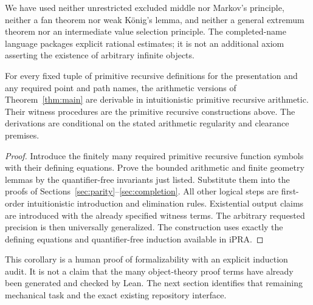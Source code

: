 We have used neither unrestricted excluded middle nor
Markov's principle, neither a fan theorem nor weak
K\"onig's lemma, and neither a general extremum theorem
nor an intermediate value selection principle.
The completed-name language packages explicit rational
estimates; it is not an additional axiom asserting the
existence of arbitrary infinite objects.

\begin{corollary}\label{cor:ipra}
For every fixed tuple of primitive recursive definitions
for the presentation and any required point and path names,
the arithmetic versions of Theorem~\ref{thm:main} are
derivable in intuitionistic primitive recursive arithmetic.
Their witness procedures are the primitive recursive
constructions above. The derivations are conditional on
the stated arithmetic regularity and clearance premises.
\end{corollary}

\begin{proof}
Introduce the finitely many required primitive recursive
function symbols with their defining equations. Prove the
bounded arithmetic and finite geometry lemmas by the
quantifier-free invariants just listed. Substitute them
into the proofs of Sections~\ref{sec:parity}--\ref{sec:completion}.
All other logical steps are first-order intuitionistic
introduction and elimination rules. Existential output
claims are introduced with the already specified witness
terms. The arbitrary requested precision is then universally
generalized. The construction uses exactly the defining
equations and quantifier-free induction available in iPRA.
\end{proof}

This corollary is a human proof of formalizability with an
explicit induction audit. It is not a claim that the many
object-theory proof terms have already been generated and
checked by Lean. The next section identifies that remaining
mechanical task and the exact existing repository interface.

